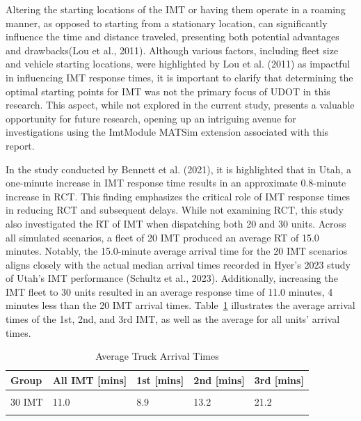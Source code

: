 \documentclass[fancy, oneside, mastersfancy, ms]{byuthesis}
\begin{document}
Altering the starting locations of the IMT or having them operate in a
roaming manner, as opposed to starting from a stationary location, can
significantly influence the time and distance traveled, presenting both
potential advantages and drawbacks(Lou et al., 2011). Although various
factors, including fleet size and vehicle starting locations, were
highlighted by Lou et al. (2011) as impactful in influencing IMT
response times, it is important to clarify that determining the optimal
starting points for IMT was not the primary focus of UDOT in this
research. This aspect, while not explored in the current study, presents
a valuable opportunity for future research, opening up an intriguing
avenue for investigations using the ImtModule MATSim extension
associated with this report.

In the study conducted by Bennett et al. (2021), it is highlighted that
in Utah, a one-minute increase in IMT response time results in an
approximate 0.8-minute increase in RCT. This finding emphasizes the
critical role of IMT response times in reducing RCT and subsequent
delays. While not examining RCT, this study also investigated the RT of
IMT when dispatching both 20 and 30 units. Across all simulated
scenarios, a fleet of 20 IMT produced an average RT of 15.0 minutes.
Notably, the 15.0-minute average arrival time for the 20 IMT scenarios
aligns closely with the actual median arrival times recorded in Hyer's
2023 study of Utah's IMT performance (Schultz et al., 2023).
Additionally, increasing the IMT fleet to 30 units resulted in an
average response time of 11.0 minutes, 4 minutes less than the 20 IMT
arrival times. Table~\ref{tbl-truck-arrival-table} illustrates the
average arrival times of the 1st, 2nd, and 3rd IMT, as well as the
average for all units' arrival times.

\hypertarget{tbl-truck-arrival-table}{}
\begin{table}
\caption{\label{tbl-truck-arrival-table}Average Truck Arrival Times }\tabularnewline

\centering
\begin{tabular}[t]{lllll}
\toprule
\textbf{Group} & \textbf{All IMT [mins]} & \textbf{1st [mins]} & \textbf{2nd [mins]} & \textbf{3rd [mins]}\\
\midrule
\cellcolor{gray!6}{20 IMT} & \cellcolor{gray!6}{15.0} & \cellcolor{gray!6}{11.1} & \cellcolor{gray!6}{21.1} & \cellcolor{gray!6}{28.9}\\
30 IMT & 11.0 & 8.9 & 13.2 & 21.2\\
\cellcolor{gray65}{\cellcolor{gray!6}{Number of Incidents}} & \cellcolor{gray65}{\cellcolor{gray!6}{280}} & \cellcolor{gray65}{\cellcolor{gray!6}{280}} & \cellcolor{gray65}{\cellcolor{gray!6}{116}} & \cellcolor{gray65}{\cellcolor{gray!6}{23}}\\
\bottomrule
\end{tabular}
\end{table}
\end{document}
